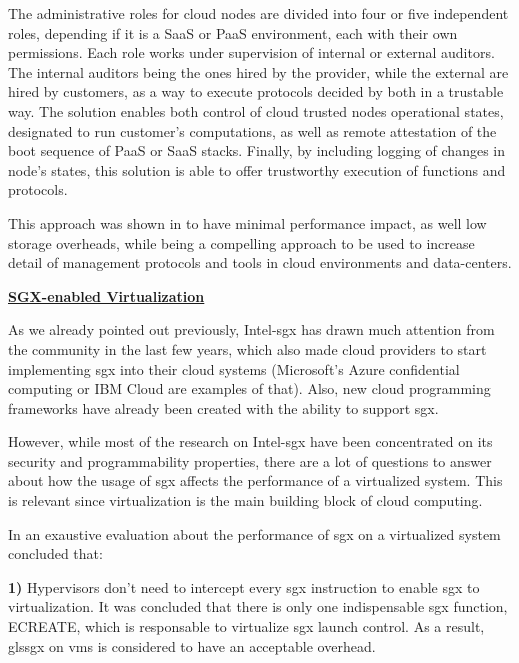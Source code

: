 The administrative roles for cloud nodes are divided into four or five independent roles, depending if it is a SaaS or PaaS environment, each with their own permissions. Each role works under supervision of internal or external auditors. The internal auditors being the ones hired by the provider, while the external are hired by customers, as a way to execute protocols decided by both in a trustable way. The solution enables both control of cloud trusted nodes operational states, designated to run customer's computations, as well as remote attestation of the boot sequence of PaaS or SaaS stacks. Finally, by including logging of changes in node's states, this solution is able to offer trustworthy execution of functions and protocols.

This approach was shown in \cite{sgxCloudThesis} to have minimal performance impact, as well low storage overheads, while being a compelling approach to be used to increase detail of management protocols and tools in cloud environments and data-centers.\newline


\underline{\textbf{SGX-enabled Virtualization}}


As we already pointed out previously, Intel-\gls{sgx} has drawn much attention from the community in the last few years, which also made cloud providers to start implementing \gls{sgx} into their cloud systems (Microsoft's Azure confidential computing or IBM Cloud are examples of that). Also, new cloud programming frameworks have already been created with the ability to support \gls{sgx}. 

However, while most of the research on Intel-\gls{sgx} have been concentrated on its security and programmability properties, there are a lot of questions to answer about how the usage of \gls{sgx} affects the performance of a virtualized system. This is relevant since virtualization is the main building block of cloud computing.

In \cite{sgxVirtualizationPaper} an exaustive evaluation about the performance of \gls{sgx} on a virtualized system concluded that:

\textbf{1)} Hypervisors don't need to intercept every \gls{sgx} instruction to enable \gls{sgx} to virtualization. It was concluded that there is only one indispensable \gls{sgx} function, ECREATE, which is responsable to virtualize \gls{sgx} launch control. As a result, gls{sgx} on \gls{vm}s is considered to have an acceptable overhead.

